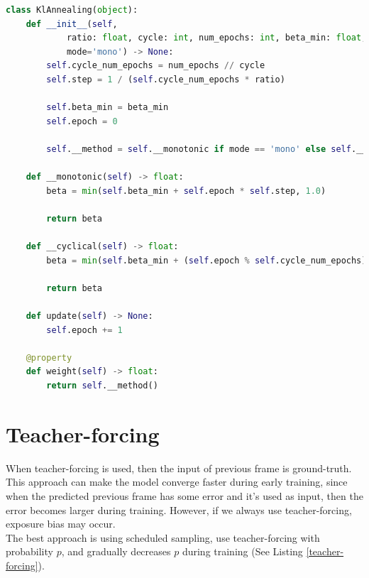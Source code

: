 \begin{lstlisting}[language=Python, caption={Python code of \textcolor{blue}{\textbf{KlAnnealing}} (some code is omitted).}, label={kl-annealing}]
class KlAnnealing(object):
    def __init__(self, 
            ratio: float, cycle: int, num_epochs: int, beta_min: float, 
            mode='mono') -> None:
        self.cycle_num_epochs = num_epochs // cycle
        self.step = 1 / (self.cycle_num_epochs * ratio)
        
        self.beta_min = beta_min
        self.epoch = 0
        
        self.__method = self.__monotonic if mode == 'mono' else self.__cyclical
        
    def __monotonic(self) -> float:
        beta = min(self.beta_min + self.epoch * self.step, 1.0)
        
        return beta
    
    def __cyclical(self) -> float:
        beta = min(self.beta_min + (self.epoch % self.cycle_num_epochs) * self.step, 1.0)
            
        return beta
    
    def update(self) -> None:
        self.epoch += 1
    
    @property
    def weight(self) -> float:
        return self.__method()\end{lstlisting}

\section{Teacher-forcing}
\indent
    When teacher-forcing is used, then the input of previous frame is ground-truth.
    This approach can make the model converge faster during early training, 
    since when the predicted previous frame has some error and it's used as input, 
    then the error becomes larger during training.
    However, if we always use teacher-forcing, exposure bias may occur. \\
    The best approach is using scheduled sampling, use teacher-forcing with probability $p$, 
    and gradually decreases $p$ during training (See Listing \ref{teacher-forcing}).

